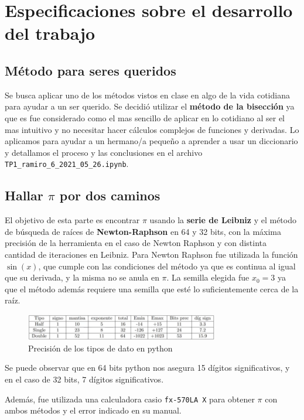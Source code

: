 \documentclass[titlepage,a4paper]{article}
\begin{document}
\section{Especificaciones sobre el desarrollo del trabajo}


\subsection{Método para seres queridos}
Se busca aplicar uno de los métodos vistos en clase en algo de la vida cotidiana para ayudar a un ser querido.
Se decidió utilizar el \textbf{método de la bisección} ya que es fue considerado como el mas sencillo de aplicar en lo cotidiano al ser el mas intuitivo y no necesitar hacer cálculos complejos de funciones y derivadas. Lo aplicamos para ayudar a un hermano/a pequeño a aprender a usar un diccionario y detallamos el proceso y las conclusiones en el archivo \verb|TP1_ramiro_6_2021_05_26.ipynb|.


\subsection{Hallar \texorpdfstring{$\pi$}p por dos caminos}
El objetivo de esta parte es encontrar $\pi$ usando la \textbf{serie de Leibniz} y el método de búsqueda de raíces de \textbf{Newton-Raphson} en 64 y 32 bits, con la máxima precisión de la herramienta en el caso de Newton Raphson y con distinta cantidad de iteraciones en Leibniz.
Para Newton Raphson fue utilizada la función $\sin(x)$, que cumple con las condiciones del método ya que es continua al igual que su derivada, y la misma no se anula en $\pi$. La semilla elegida fue $x_0=3$ ya que el método además requiere una semilla que esté lo suficientemente cerca de la raíz.

\begin{figure}[H]
  \centering
    \includegraphics[width=0.75\textwidth]{tablita.png}
      \caption{Precisión de los tipos de dato en python}
\end{figure}
Se puede observar que en 64 bits python nos asegura 15 dígitos significativos, y en el caso de 32 bits, 7 dígitos significativos.

Además, fue utilizada una calculadora casio \verb|fx-570LA X| para obtener $\pi$ con ambos métodos y el error indicado en su manual.
\end{document}
